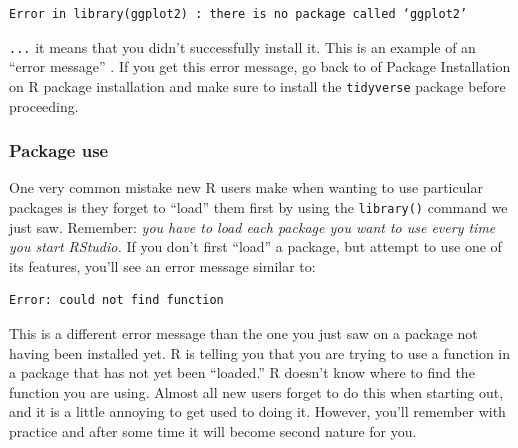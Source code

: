 \documentclass[
]{article}
\begin{document}
\begin{verbatim}
Error in library(ggplot2) : there is no package called ‘ggplot2’
\end{verbatim}

\texttt{...} it means that you didn't successfully install it. This is
an example of an ``error message'' . If you get this error message, go
back to of Package Installation on R package installation and make sure
to install the \texttt{tidyverse} package before proceeding.

\hypertarget{package-use}{%
\subsubsection{Package use}\label{package-use}}

One very common mistake new R users make when wanting to use particular
packages is they forget to ``load'' them first by using the
\texttt{library()} command we just saw. Remember: \emph{you have to load
each package you want to use every time you start RStudio.} If you don't
first ``load'' a package, but attempt to use one of its features, you'll
see an error message similar to:

\begin{verbatim}
Error: could not find function
\end{verbatim}

This is a different error message than the one you just saw on a package
not having been installed yet. R is telling you that you are trying to
use a function in a package that has not yet been ``loaded.'' R doesn't
know where to find the function you are using. Almost all new users
forget to do this when starting out, and it is a little annoying to get
used to doing it. However, you'll remember with practice and after some
time it will become second nature for you.
\end{document}
